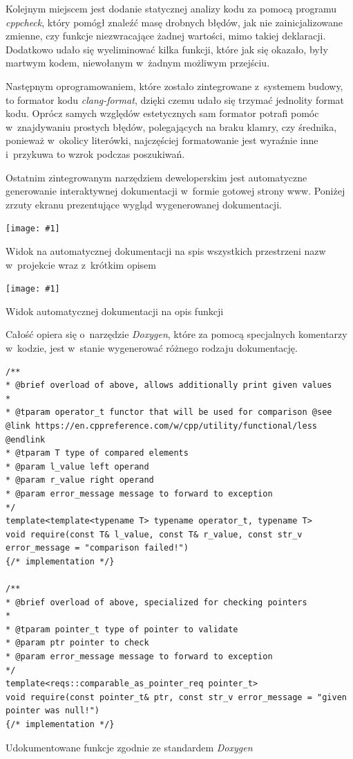 \documentclass[12pt]{article}
\newcommand{\n}{\newline}
\newcommand{\putss}[3]{
\begin{captioned}[H]
	\centering
	\texttt{[image: \#1]}
	\caption{#2}
	\label{#3}
	\medskip
\end{captioned}
}
\newcommand{\nonpl}[1]{{\it #1}}
\begin{document}
{{{				Kolejnym miejscem jest dodanie statycznej analizy kodu za pomocą programu \nonpl{cppcheck}\cite{cppcheck_repo}, który pomógł znaleźć masę drobnych błędów,
				jak nie zainicjalizowane zmienne, czy funkcje niezwracające żadnej wartości, mimo takiej deklaracji. Dodatkowo udało się wyeliminować kilka funkcji,
				które jak się okazało, były martwym kodem, niewołanym w~żadnym możliwym przejściu.\n

				Następnym oprogramowaniem, które zostało zintegrowane z~systemem budowy, to formator kodu \nonpl{clang-format}\cite{clangformat_docs}, dzięki czemu
				udało się trzymać jednolity format kodu. Oprócz samych względów estetycznych sam formator potrafi pomóc w~znajdywaniu prostych błędów, polegających
				na braku klamry, czy średnika, ponieważ w~okolicy literówki, najczęściej formatowanie jest wyraźnie inne i~przykuwa to wzrok podczas poszukiwań.\n

				Ostatnim zintegrowanym narzędziem deweloperskim jest automatyczne generowanie interaktywnej dokumentacji w~formie gotowej strony www. Poniżej zrzuty
				ekranu prezentujące wygląd wygenerowanej dokumentacji.\n

				\putss{./img/documentation_part_1.png}{Widok na automatycznej dokumentacji na spis wszystkich przestrzeni nazw w~projekcie wraz z~krótkim opisem}{docs_1}
				\putss{./img/documentation_part_2.png}{Widok automatycznej dokumentacji na opis funkcji}{docs_2}

				\newpage

				Całość opiera się o~narzędzie \nonpl{Doxygen}\cite{doxygen_docs}, które za pomocą specjalnych komentarzy w~kodzie,
				jest w~stanie wygenerować różnego rodzaju dokumentację.\n

				\begin{captioned}[H]
					\begin{lstlisting}[frame=single]
/**
* @brief overload of above, allows additionally print given values
*
* @tparam operator_t functor that will be used for comparison @see @link https://en.cppreference.com/w/cpp/utility/functional/less @endlink
* @tparam T type of compared elements
* @param l_value left operand
* @param r_value right operand
* @param error_message message to forward to exception
*/
template<template<typename T> typename operator_t, typename T>
void require(const T& l_value, const T& r_value, const str_v error_message = "comparison failed!")
{/* implementation */}

/**
* @brief overload of above, specialized for checking pointers
*
* @tparam pointer_t type of pointer to validate
* @param ptr pointer to check
* @param error_message message to forward to exception
*/
template<reqs::comparable_as_pointer_req pointer_t>
void require(const pointer_t& ptr, const str_v error_message = "given pointer was null!")
{/* implementation */}
					\end{lstlisting}
					\caption{ Udokumentowane funkcje zgodnie ze standardem \nonpl{Doxygen}}
					\label{doxygen_code}
				\end{captioned}
			}
		}

}
\end{document}
